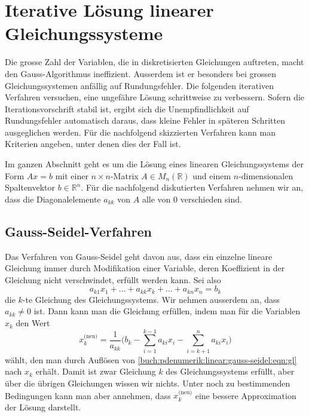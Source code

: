%
%
\section{Iterative Lösung linearer Gleichungssysteme
\label{buch:pdenumerik:section:linear}}
Die grosse Zahl der Variablen, die in diskretisierten Gleichungen auftreten,
macht den Gauss-Algorithmus ineffizient.
Ausserdem ist er besonders bei grossen Gleichungssystemen anfällig auf
Rundungsfehler.
Die folgenden iterativen Verfahren versuchen, eine ungefähre Lösung
schrittweise zu verbessern.
Sofern die Iterationsvorschrift stabil ist, ergibt sich die Unempfindlichkeit
auf Rundungsfehler automatisch daraus, dass kleine Fehler in späteren
Schritten ausgeglichen werden.
Für die nachfolgend skizzierten Verfahren kann man Kriterien angeben,
unter denen dies der Fall ist.

Im ganzen Abschnitt geht es um die Lösung eines linearen Gleichungssystems
der Form $Ax=b$ mit einer $n\times n$-Matrix $A\in M_n(\mathbb{R})$ und
einem $n$-dimensionalen Spaltenvektor $b\in\mathbb{R}^n$.
Für die nachfolgend diskutierten Verfahren nehmen wir an, dass die
Diagonalelemente $a_{kk}$ von $A$ alle von $0$ verschieden sind.

%
%
\subsection{Gauss-Seidel-Verfahren
\label{buch:pdenumerik:linear:subsection:gauss-seidel}}
Das Verfahren von Gauss-Seidel geht davon aus, dass ein einzelne lineare
%
Gleichung immer durch Modifikation einer Variable, deren Koeffizient in
der Gleichung nicht verschwindet, erfüllt werden kann.
Sei also
\begin{equation}
a_{k1}x_1 + \dots + a_{kk}x_k + \dots + a_{kn}x_n = b_k
\label{buch:pdenumerik:linear:gauss-seidel:eqn:gl}
\end{equation}
die $k$-te Gleichung des Gleichungssystems.
Wir nehmen ausserdem an, dass $a_{kk}\ne 0$ ist.
Dann kann man die Gleichung erfüllen, indem man für die Variablen $x_k$
den Wert
\begin{equation}
x_k^{\text{(neu)}}
=
\frac{1}{a_{kk}}
\biggl(
b_k
-
\sum_{i=1}^{k-1}a_{ki}x_i
-
\sum_{i=k+1}^na_{ki}x_i
\biggr)
\label{buch:pdenumerik:linear:gauss-seidel:eqn:schritt}
\end{equation}
wählt, den man durch Auflösen von
\eqref{buch:pdenumerik:linear:gauss-seidel:eqn:gl}
nach $x_k$ erhält.
Damit ist zwar Gleichung $k$ des Gleichungssystems erfüllt, aber über die
übrigen Gleichungen wissen wir nichts.
Unter noch zu bestimmenden Bedingungen kann man aber annehmen, dass 
$x_k^{\text{(neu)}}$ eine bessere Approximation der Lösung darstellt.

